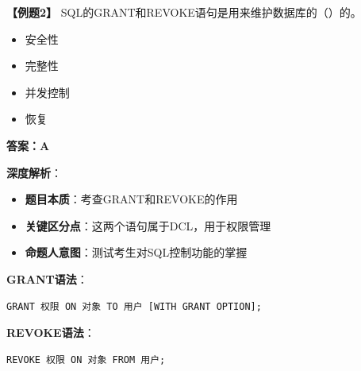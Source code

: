 \documentclass[12pt, a4paper]{article}
\newenvironment{bluebox}[1]{%
  \begin{trivlist}
  \item[\hskip\labelsep \textbf{#1}]
  \setlength{\parskip}{0.5ex}
  \setlength{\itemsep}{0.5ex}
}{%
  \end{trivlist}
}
\begin{document}
\begin{bluebox}{例题2：权限控制语句}
	\textbf{【例题2】} SQL的GRANT和REVOKE语句是用来维护数据库的（\quad）的。

	\begin{itemize}
		\item[A)] 安全性
		\item[B)] 完整性
		\item[C)] 并发控制
		\item[D)] 恢复
	\end{itemize}

	\textbf{答案：A}

	\textbf{深度解析}：

	\begin{itemize}
		\item \textbf{题目本质}：考查GRANT和REVOKE的作用
		\item \textbf{关键区分点}：这两个语句属于DCL，用于权限管理
		\item \textbf{命题人意图}：测试考生对SQL控制功能的掌握
	\end{itemize}

	\textbf{GRANT语法}：
	\begin{verbatim}
GRANT 权限 ON 对象 TO 用户 [WITH GRANT OPTION];
	\end{verbatim}

	\textbf{REVOKE语法}：
	\begin{verbatim}
REVOKE 权限 ON 对象 FROM 用户;
	\end{verbatim}
\end{bluebox}
\end{document}
